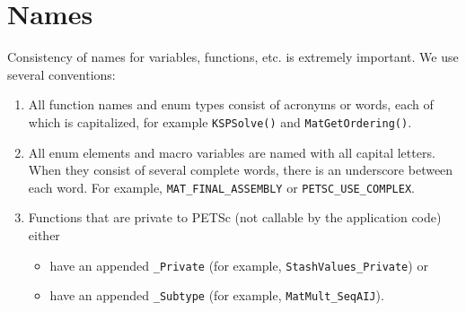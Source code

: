 \section{Names}\label{sec:stylenames}
Consistency of names for variables, functions, etc. is extremely
important.
We use several conventions:
\begin{enumerate}
\item All function names and enum types consist of acronyms or words, each of
  which is capitalized, for example \lstinline{KSPSolve()} and
      \lstinline{MatGetOrdering()}.
\item All enum elements and macro variables are named with all capital letters. When
      they consist of several complete words, there is an underscore between each word. 
      For example, \lstinline{MAT_FINAL_ASSEMBLY} or \lstinline{PETSC_USE_COMPLEX}.
\item Functions that are private to PETSc (not callable by the
      application code) either
      \begin{itemize}
        \item have an appended \lstinline{_Private} (for example,
           \lstinline{StashValues_Private}) or
        \item have an appended \lstinline{_Subtype} (for example,
           \lstinline{MatMult_SeqAIJ}).
      \end{itemize}


\end{enumerate}
